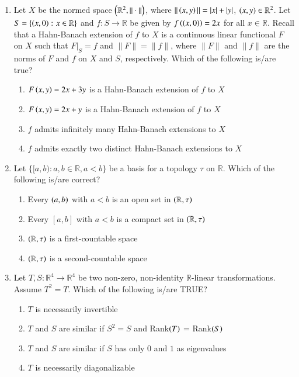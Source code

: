 \documentclass[journal,12pt,onecolumn]{IEEEtran}
\theoremstyle{remark}
\begin{document}
\begin{enumerate}
\item Let $X$ be the normed space $\left(\mathbb{R}^2, \|\cdot\|\right)$, where $\|\left(x, y\right)\| = \left\vert x\right\vert + \left\vert y\right\vert$, $\left(x, y\right) \in \mathbb{R}^2$. Let $S = \{\left(x, 0\right) \colon x \in \mathbb{R}\}$ and $f \colon S \to \mathbb{R}$ be given by $f\left(\left(x, 0\right)\right) = 2x$ for all $x \in \mathbb{R}$. Recall that a Hahn-Banach extension of $f$ to $X$ is a continuous linear functional $F$ on $X$ such that $F|_S = f$ and $\|F\| = \|f\|$, where $\|F\|$ and $\|f\|$ are the norms of $F$ and $f$ on $X$ and $S$, respectively. Which of the following is/are true? \hfill{}
\begin{enumerate}
    \item $F\left(x, y\right) = 2x + 3y$ is a Hahn-Banach extension of $f$ to $X$
    \item $F\left(x, y\right) = 2x + y$ is a Hahn-Banach extension of $f$ to $X$
    \item $f$ admits infinitely many Hahn-Banach extensions to $X$
    \item $f$ admits exactly two distinct Hahn-Banach extensions to $X$
\end{enumerate}

\item Let $\{[a, b) \colon a, b \in \mathbb{R}, a < b\}$ be a basis for a topology $\tau$ on $\mathbb{R}$. Which of the following is/are correct? \hfill{}
\begin{enumerate}
    \item Every $\left(a, b\right)$ with $a < b$ is an open set in $\left(\mathbb{R}, \tau\right)$
    \item Every $[a, b]$ with $a < b$ is a compact set in $\left(\mathbb{R}, \tau\right)$
    \item $\left(\mathbb{R}, \tau\right)$ is a first-countable space
    \item $\left(\mathbb{R}, \tau\right)$ is a second-countable space
\end{enumerate}

\item Let $T, S \colon \mathbb{R}^4 \to \mathbb{R}^4$ be two non-zero, non-identity $\mathbb{R}$-linear transformations. Assume $T^2 = T$. Which of the following is/are TRUE? \hfill{}
\begin{enumerate}
    \item $T$ is necessarily invertible
    \item $T$ and $S$ are similar if $S^2 = S$ and Rank$\left(T\right)$ = Rank$\left(S\right)$
    \item $T$ and $S$ are similar if $S$ has only $0$ and $1$ as eigenvalues
    \item $T$ is necessarily diagonalizable
\end{enumerate}


\end{enumerate}
\end{document}
